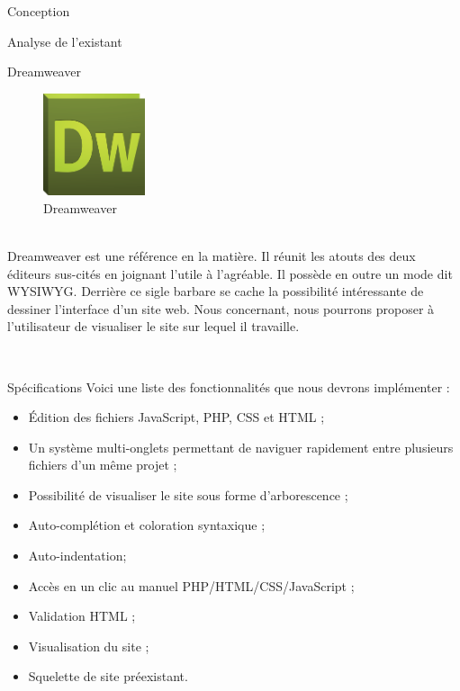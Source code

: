 \documentclass[a4paper, 12pt]{report}
\begin{document}
\begin{part}{Conception}
\begin{chapter}{Analyse de l'existant}
			\begin{section}{Dreamweaver}
				\begin{figure}[h]
					\begin{center}
						\includegraphics[width=3cm]{images/logoDreamweaver.png}
						\caption{Dreamweaver}
					\end{center}
				\end{figure}~\\
				Dreamweaver est une référence en la matière. Il réunit les atouts des deux éditeurs sus-cités en joignant l'utile à l'agréable.
				Il possède en outre un mode dit WYSIWYG. Derrière ce sigle barbare se cache la possibilité intéressante de dessiner l'interface d'un site web.
				Nous concernant, nous pourrons proposer à l'utilisateur de visualiser le site sur lequel il travaille.
			\end{section}
			~\\
		\end{chapter}
		\begin{chapter}{Spécifications}				
				Voici une liste des fonctionnalités que nous devrons implémenter :
				\begin{itemize}
					\item Édition des fichiers JavaScript, PHP, CSS et HTML ;
					\item Un système multi-onglets permettant de naviguer rapidement entre plusieurs fichiers d'un même projet ;
					\item Possibilité de visualiser le site sous forme d'arborescence ;
					\item Auto-complétion et coloration syntaxique ;
					\item Auto-indentation;
					\item Accès en un clic au manuel PHP/HTML/CSS/JavaScript ;
					\item Validation HTML ;
					\item Visualisation du site ;
					\item Squelette de site préexistant.
				\end{itemize}
			~\\
		\end{chapter}
	\end{part}
\end{document}
